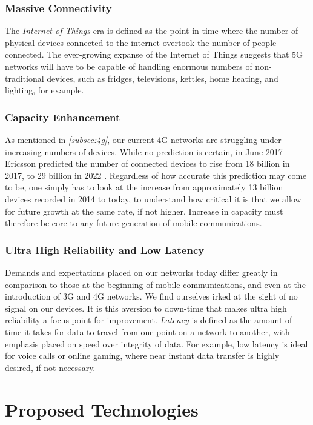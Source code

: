 \documentclass[journal]{IEEEtran}
\begin{document}
\subsubsection{Massive Connectivity}
The \textit{Internet of Things} era is defined as the point in time where the number of physical devices connected to the internet overtook the number of people connected. The ever-growing expanse of the Internet of Things suggests that 5G networks will have to be capable of handling enormous numbers of non-traditional devices, such as fridges, televisions, kettles, home heating, and lighting, for example.

\subsubsection{Capacity Enhancement}
As mentioned in \textit{\ref{subsec:4g}}, our current 4G networks are struggling under increasing numbers of devices. While no prediction is certain, in June 2017 Ericsson predicted the number of connected devices to rise from 18 billion in 2017, to 29 billion in 2022 \cite{ericssondev}. Regardless of how accurate this prediction may come to be, one simply has to look at the increase from approximately 13 billion devices recorded in 2014 \cite{ericssondev} to today, to understand how critical it is that we allow for future growth at the same rate, if not higher. Increase in capacity must therefore be core to any future generation of mobile communications.

\subsubsection{Ultra High Reliability and Low Latency}
Demands and expectations placed on our networks today differ greatly in comparison to those at the beginning of mobile communications, and even at the introduction of 3G and 4G networks. We find ourselves irked at the sight of no signal on our devices. It is this aversion to down-time that makes ultra high reliability a focus point for improvement. \textit{Latency} is defined as the amount of time it takes for data to travel from one point on a network to another, with emphasis placed on speed over integrity of data. For example, low latency is ideal for voice calls or online gaming, where near instant data transfer is highly desired, if not necessary.

\section{Proposed Technologies}
\end{document}
